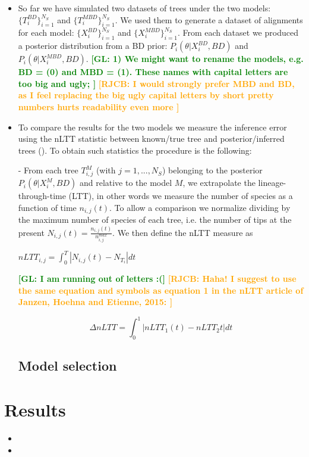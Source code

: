 \documentclass{article}
\newcommand*\richel[1]{\textcolor{orange}{\textbf{[RJCB: #1]}}}
\newcommand*\gio[1]{\textcolor{green}{\textbf{[GL: #1]}}}
\begin{document}
\begin{itemize}
\item So far we have simulated two datasets of trees under the two models: 
$\{T_{i}^{BD}\}_{i=1}^{N_{S}}$ and $\{T_{i}^{MBD}\}_{i=1}^{N_{S}}$.
We used them to generate a dataset of alignments for each model: $\{X^{BD}_{i}\}_{i=1}^{N_{S}}$ and $\{X^{MBD}_{i}\}_{i=1}^{N_{S}}$. From each dataset we produced a posterior distribution from a BD prior: 
$P_{i}(\theta | X^{BD}_{i}, BD)$ and $P_{i}(\theta | X^{MBD}_{i}, BD)$.
\gio{
  1) We might want to rename the models, e.g. BD = (0) and MBD = (1). 
  These names with capital letters are too big and ugly;
}
\richel{
  I would strongly prefer MBD and BD, as I feel replacing the big ugly 
  capital letters by short pretty numbers hurts readability even more 
}

\item To compare the results for the two models we measure the inference 
error using the nLTT statistic between known/true tree and 
posterior/inferred trees (\cite{nltt}). 
To obtain such statistics the procedure is the following:

- From each tree $T_{i,j}^{M}$ (with $j=1,...,N_{S}$) 
  belonging to the posterior $P_{i}(\theta | X^{M}_{i}, BD)$ 
  and relative to the model $M$, we extrapolate the lineage-through-time (LTT), 
  in other words we measure the number of species as a function of 
  time $n_{i,j}(t)$. To allow a comparison we normalize dividing by the 
  maximum number of species of each tree, i.e. the number of tips at the 
  present $N_{i,j}(t)=\frac{n_{i,j}(t)}{n^{max}_{i,j}}$. We then define the 
  nLTT measure as

$nLTT_{i,j} = \int_{0}^{T} | N_{i,j}(t) - N_{T_{i}} | dt$

\gio{I am running out of letters :(}
\richel{Haha! I suggest to use the same equation and symbols 
  as equation 1 in
  the nLTT article of Janzen, Hoehna and Etienne, 2015:
}

$$
\Delta nLTT = \int_{0}^{1} | nLTT_1(t) - nLTT_2{t} | dt
$$

\subsection{Model selection}

\end{itemize}

\section{Results}
\begin{itemize}

\item

\item

\end{itemize}
\end{document}
